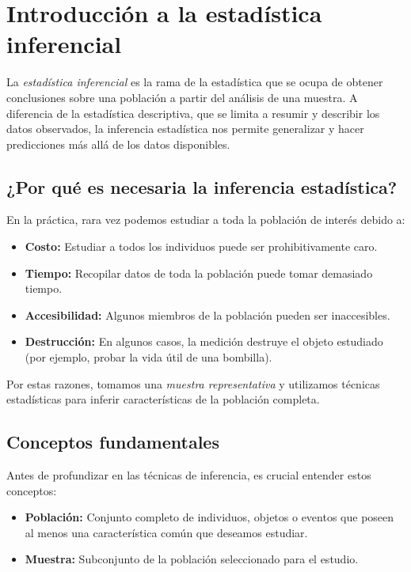 \section*{Introducción a la estadística inferencial}

La \emph{estadística inferencial} es la rama de la estadística que se ocupa de obtener conclusiones sobre una población a partir del análisis de una muestra. A diferencia de la estadística descriptiva, que se limita a resumir y describir los datos observados, la inferencia estadística nos permite generalizar y hacer predicciones más allá de los datos disponibles.

\subsection*{¿Por qué es necesaria la inferencia estadística?}

En la práctica, rara vez podemos estudiar a toda la población de interés debido a:

\begin{itemize}
	\item \textbf{Costo:} Estudiar a todos los individuos puede ser prohibitivamente caro.
	\item \textbf{Tiempo:} Recopilar datos de toda la población puede tomar demasiado tiempo.
	\item \textbf{Accesibilidad:} Algunos miembros de la población pueden ser inaccesibles.
	\item \textbf{Destrucción:} En algunos casos, la medición destruye el objeto estudiado (por ejemplo, probar la vida útil de una bombilla).
\end{itemize}

Por estas razones, tomamos una \emph{muestra representativa} y utilizamos técnicas estadísticas para inferir características de la población completa.

\subsection*{Conceptos fundamentales}

Antes de profundizar en las técnicas de inferencia, es crucial entender estos conceptos:

\begin{definicion}
	\begin{itemize}
		\item \textbf{Población:} Conjunto completo de individuos, objetos o eventos que poseen al menos una característica común que deseamos estudiar.
		\item \textbf{Muestra:} Subconjunto de la población seleccionado para el estudio.
	\end{itemize}
\end{definicion}

